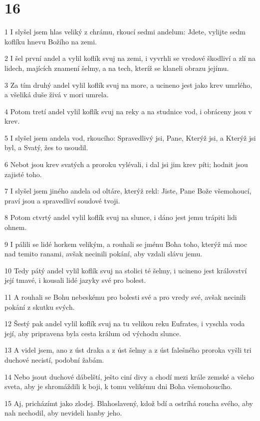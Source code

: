 \chapter{16}

\par 1 I slyšel jsem hlas veliký z chrámu, rkoucí sedmi andelum: Jdete, vylijte sedm koflíku hnevu Božího na zemi.
\par 2 I šel první andel a vylil koflík svuj na zemi, i vyvrhli se vredové škodliví a zlí na lidech, majících znamení šelmy, a na tech, kteríž se klaneli obrazu jejímu.
\par 3 Za tím druhý andel vylil koflík svuj na more, a ucineno jest jako krev umrlého, a všeliká duše živá v mori umrela.
\par 4 Potom tretí andel vylil koflík svuj na reky a na studnice vod, i obráceny jsou v krev.
\par 5 I slyšel jsem andela vod, rkoucího: Spravedlivý jsi, Pane, Kterýž jsi, a Kterýž jsi byl, a Svatý, žes to usoudil.
\par 6 Nebot jsou krev svatých a proroku vylévali, i dal jsi jim krev píti; hodnit jsou zajisté toho.
\par 7 I slyšel jsem jiného andela od oltáre, kterýž rekl: Jiste, Pane Bože všemohoucí, praví jsou a spravedliví soudové tvoji.
\par 8 Potom ctvrtý andel vylil koflík svuj na slunce, i dáno jest jemu trápiti lidi ohnem.
\par 9 I pálili se lidé horkem velikým, a rouhali se jménu Boha toho, kterýž má moc nad temito ranami, avšak necinili pokání, aby vzdali slávu jemu.
\par 10 Tedy pátý andel vylil koflík svuj na stolici té šelmy, i ucineno jest království její tmavé, i kousali lidé jazyky své pro bolest.
\par 11 A rouhali se Bohu nebeskému pro bolesti své a pro vredy své, avšak necinili pokání z skutku svých.
\par 12 Šestý pak andel vylil koflík svuj na tu velikou reku Eufrates, i vyschla voda její, aby pripravena byla cesta králum od východu slunce.
\par 13 A videl jsem, ano z úst draka a z úst šelmy a z úst falešného proroka vyšli tri duchové necistí, podobní žabám.
\par 14 Nebo jsout duchové dábelští, ješto ciní divy a chodí mezi krále zemské a všeho sveta, aby je shromáždili k boji, k tomu velikému dni Boha všemohoucího.
\par 15 Aj, pricházímt jako zlodej. Blahoslavený, kdož bdí a ostríhá roucha svého, aby nah nechodil, aby nevideli hanby jeho.
